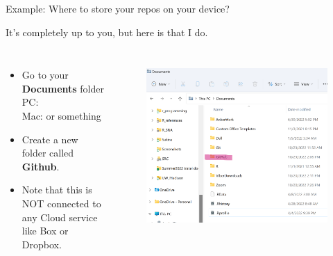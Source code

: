 \documentclass[aspectratio=169]{beamer} %
\begin{document}
\begin{frame}{Example: Where to store your repos on your device?}
	
	It's completely up to you, but here is that I do. 
	
	\begin{columns}[c]
		
		
		\begin{itemize}
			\setlength\itemsep{3mm}
			\item Go to your \textbf{Documents} folder \\
			{\small PC: } \\
			{\small Mac:  or something}
			\item Create a new folder called \textbf{Github}.
			\item Note that this is NOT connected to any Cloud service like Box or Dropbox. 
		\end{itemize}
		
		\begin{figure}
			\centering
			\includegraphics[width=\linewidth]{img/FolderExample}
			\label{fig:folderexample}
		\end{figure}

	\end{columns}	
\end{frame}
\end{document}
